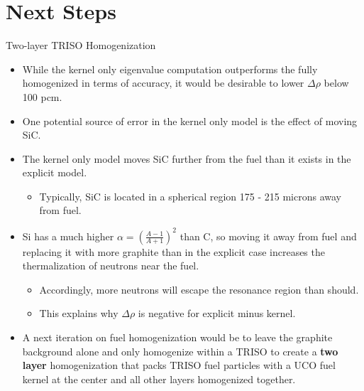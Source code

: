 \documentclass[9pt,t,aspectratio=169]{beamer}
\begin{document}
\section{Next Steps}
\begin{frame}{Two-layer TRISO Homogenization}
    \pause
    \begin{itemize}
        \item<2-> While the kernel only eigenvalue computation outperforms the fully homogenized in terms of accuracy, it would be desirable to lower $\Delta \rho$ below 100 pcm.
        \item<3-> One potential source of error in the kernel only model is the effect of moving SiC.
        \item<4-> The kernel only model moves SiC further from the fuel than it exists in the explicit model.
        \begin{itemize}
            \item<5-> Typically, SiC is located in a spherical region 175 - 215 microns away from fuel.
        \end{itemize}
        \item<6-> Si has a much higher $\alpha = (\frac{A-1}{A+1})^2$ than C, so moving it away from fuel and replacing it with more graphite than in the explicit case increases the thermalization of neutrons near the fuel.
        \begin{itemize}
            \item<7-> Accordingly, more neutrons will escape the resonance region than should.
            \item<8-> This explains why $\Delta \rho$ is negative for explicit minus kernel.
        \end{itemize}
        \item<9-> A next iteration on fuel homogenization would be to leave the graphite background alone and only homogenize within a TRISO to create a \textbf{two layer} homogenization that packs TRISO fuel particles with a UCO fuel kernel at the center and all other layers homogenized together. 
    \end{itemize}
\end{frame}

\end{document}
